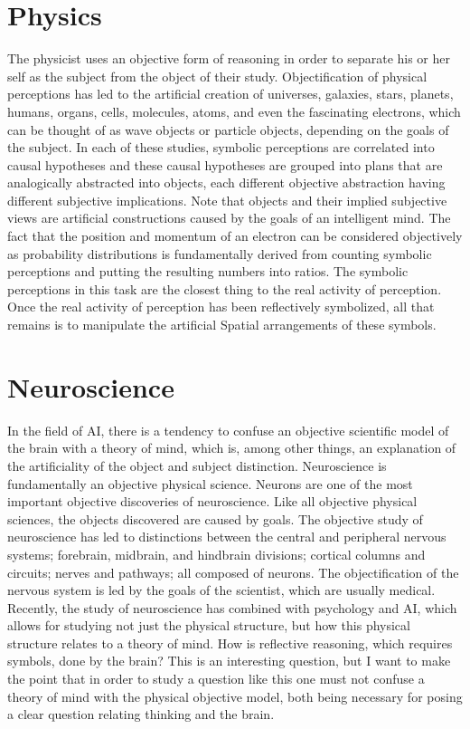 \section{Physics}

The physicist uses an objective form of reasoning in order to separate
his or her self as the subject from the object of their study.
Objectification of physical perceptions has led to the artificial
creation of universes, galaxies, stars, planets, humans, organs,
cells, molecules, atoms, and even the fascinating electrons, which can
be thought of as wave objects or particle objects, depending on the
goals of the subject.  In each of these studies, symbolic perceptions
are correlated into causal hypotheses and these causal hypotheses are
grouped into plans that are analogically abstracted into objects, each
different objective abstraction having different subjective
implications.  Note that objects and their implied subjective views
are artificial constructions caused by the goals of an intelligent
mind.  The fact that the position and momentum of an electron can be
considered objectively as probability distributions is fundamentally
derived from counting symbolic perceptions and putting the resulting
numbers into ratios.  The symbolic perceptions in this task are the
closest thing to the real activity of perception.  Once the real
activity of perception has been reflectively symbolized, all that
remains is to manipulate the artificial Spatial arrangements of these
symbols.

\section{Neuroscience}

In the field of AI, there is a tendency to confuse an objective
scientific model of the brain with a theory of mind, which is, among
other things, an explanation of the artificiality of the object and
subject distinction.  Neuroscience is fundamentally an objective
physical science.  Neurons are one of the most important objective
discoveries of neuroscience.  Like all objective physical sciences,
the objects discovered are caused by goals.  The objective study of
neuroscience has led to distinctions between the central and
peripheral nervous systems; forebrain, midbrain, and hindbrain
divisions; cortical columns and circuits; nerves and pathways; all
composed of neurons.  The objectification of the nervous system is led
by the goals of the scientist, which are usually medical.  Recently,
the study of neuroscience has combined with psychology and AI, which
allows for studying not just the physical structure, but how this
physical structure relates to a theory of mind.  How is reflective
reasoning, which requires symbols, done by the brain?  This is an
interesting question, but I want to make the point that in order to
study a question like this one must not confuse a theory of mind with
the physical objective model, both being necessary for posing a clear
question relating thinking and the brain.

